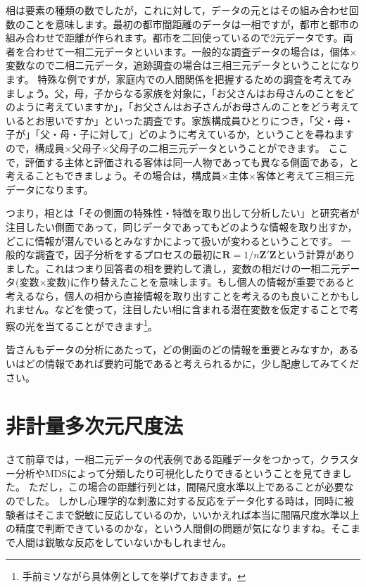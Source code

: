 \documentclass{ltjsbook}
\begin{document}
相は要素の種類の数でしたが，これに対して，データの元とはその組み合わせ回数のことを意味します。最初の都市間距離のデータは一相ですが，都市と都市の組み合わせで距離が作られます。都市を二回使っているので2元データです。両者を合わせて一相二元データといいます。一般的な調査データの場合は，個体$\times$変数なので二相二元データ，追跡調査の場合は三相三元データということになります。
特殊な例ですが，家庭内での人間関係を把握するための調査を考えてみましょう。父，母，子からなる家族を対象に，「お父さんはお母さんのことをどのように考えていますか」，「お父さんはお子さんがお母さんのことをどう考えているとお思いですか」といった調査です。家族構成員ひとりにつき，「父・母・子が」「父・母・子に対して」どのように考えているか，ということを尋ねますので，構成員$\times$父母子$\times$父母子の二相三元データということができます。
ここで，評価する主体と評価される客体は同一人物であっても異なる側面である，と考えることもできましょう。その場合は，構成員$\times$主体$\times$客体と考えて三相三元データになります。

つまり，相とは「その側面の特殊性・特徴を取り出して分析したい」と研究者が注目したい側面であって，同じデータであってもどのような情報を取り出すか，どこに情報が潜んでいるとみなすかによって扱いが変わるということです。
一般的な調査で，因子分析をするプロセスの最初に$\bm{R} = 1/n\bm{Z'Z}$という計算がありました。これはつまり回答者の相を要約して潰し，変数の相だけの一相二元データ(変数$\times$変数)に作り替えたことを意味します。もし個人の情報が重要であると考えるなら，個人の相から直接情報を取り出すことを考えるのも良いことかもしれません。などを使って，注目したい相に含まれる潜在変数を仮定することで考察の光を当てることができます\footnote{手前ミソながら具体例として\citet{kosugi2011}を挙げておきます。}。

皆さんもデータの分析にあたって，どの側面のどの情報を重要とみなすか，あるいはどの情報であれば要約可能であると考えられるかに，少し配慮してみてください。

\section{非計量多次元尺度法}

さて前章では，一相二元データの代表例である距離データをつかって，クラスター分析やMDSによって分類したり可視化したりできるということを見てきました。
ただし，この場合の距離行列とは，間隔尺度水準以上であることが必要なのでした。
しかし心理学的な刺激に対する反応をデータ化する時は，同時に被験者はそこまで鋭敏に反応しているのか，いいかえれば本当に間隔尺度水準以上の精度で判断できているのかな，という人間側の問題が気になりますね。そこまで人間は鋭敏な反応をしていないかもしれません。
\end{document}
